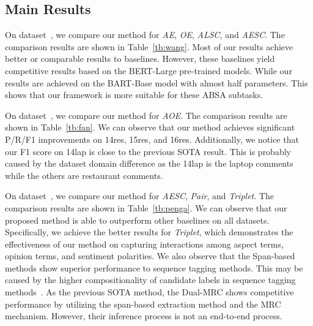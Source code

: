 \documentclass[11pt,a4paper]{article}
\begin{document}
\subsection{Main Results}
On    dataset~\citep{DBLP:conf/aaai/WangPDX17}, we compare our method for \emph{AE}, \emph{OE}, \emph{ALSC}, and \emph{AESC}. The comparison results are shown in Table~\ref{tb:wang}.  Most of our results achieve better or comparable results to baselines.  However, these baselines yield competitive results based on the BERT-Large pre-trained models. While our results are achieved on the BART-Base model with almost half parameters. This shows that our framework is more suitable for these ABSA subtasks.

On  dataset~\citep{DBLP:conf/naacl/FanWDHC19}, we compare our method for \emph{AOE}. The comparison results are shown in Table~\ref{tb:fan}.
We can observe that  our method achieves  significant P/R/F1 improvements on 14res, 15res, and 16res. Additionally, we notice that  our F1 score  on 14lap is close to the previous SOTA result. This is probably caused by the dataset domain difference as the 14lap is the laptop comments while the others are restaurant comments.


On  dataset~\citep{DBLP:conf/aaai/PengXBHLS20}, we compare our method for  \emph{AESC}, \emph{Pair}, and \emph{Triplet}. The comparison results are shown in Table~\ref{tb:penga}. We can observe that our proposed method is able to outperform  other baselines on all datasets. Specifically, we achieve the better results  for \emph{Triplet}, which  demonstrates the effectiveness of our method on capturing interactions among aspect terms, opinion terms, and sentiment polarities. We also observe that the Span-based methods show superior performance to sequence tagging methods. This may be caused by the higher compositionality of candidate labels in  sequence tagging methods~\citep{DBLP:conf/acl/HuPHLL19}. As the previous SOTA method, the Dual-MRC shows competitive performance by utilizing  the span-based extraction method and the MRC mechanism. However, their inference process is  not an  end-to-end process.
\end{document}
